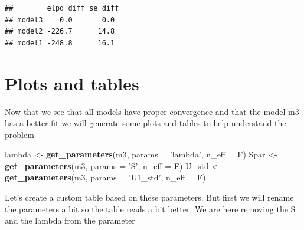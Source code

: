 \documentclass[
]{book}
\newenvironment{Shaded}{\begin{snugshade}}{\end{snugshade}}
\newcommand{\DataTypeTok}[1]{\textcolor[rgb]{0.13,0.29,0.53}{#1}}
\newcommand{\DecValTok}[1]{\textcolor[rgb]{0.00,0.00,0.81}{#1}}
\newcommand{\KeywordTok}[1]{\textcolor[rgb]{0.13,0.29,0.53}{\textbf{#1}}}
\newcommand{\NormalTok}[1]{#1}
\newcommand{\OperatorTok}[1]{\textcolor[rgb]{0.81,0.36,0.00}{\textbf{#1}}}
\newcommand{\StringTok}[1]{\textcolor[rgb]{0.31,0.60,0.02}{#1}}
\begin{document}
\begin{verbatim}
##        elpd_diff se_diff
## model3    0.0       0.0 
## model2 -226.7      14.8 
## model1 -248.8      16.1
\end{verbatim}

\hypertarget{plots-and-tables}{%
\section{Plots and tables}\label{plots-and-tables}}

Now that we see that all models have proper convergence and that the model m3 has a better fit we will generate some plots and tables to help understand the problem

\begin{Shaded}
\begin{Highlighting}[]
\NormalTok{lambda <-}\StringTok{ }\KeywordTok{get_parameters}\NormalTok{(m3, }\DataTypeTok{params =} \StringTok{'lambda'}\NormalTok{, }\DataTypeTok{n_eff =}\NormalTok{ F)}
\NormalTok{Spar <-}\StringTok{ }\KeywordTok{get_parameters}\NormalTok{(m3, }\DataTypeTok{params =} \StringTok{'S'}\NormalTok{, }\DataTypeTok{n_eff =}\NormalTok{ F)}
\NormalTok{U_std <-}\StringTok{ }\KeywordTok{get_parameters}\NormalTok{(m3, }\DataTypeTok{params =} \StringTok{'U1_std'}\NormalTok{, }\DataTypeTok{n_eff =}\NormalTok{ F)}
\end{Highlighting}
\end{Shaded}

Let's create a custom table based on these parameters. But first we will rename the parameters a bit so the table reads a bit better. We are here removing the S and the lambda from the parameter

\begin{Shaded}
\end{Shaded}
\end{document}
